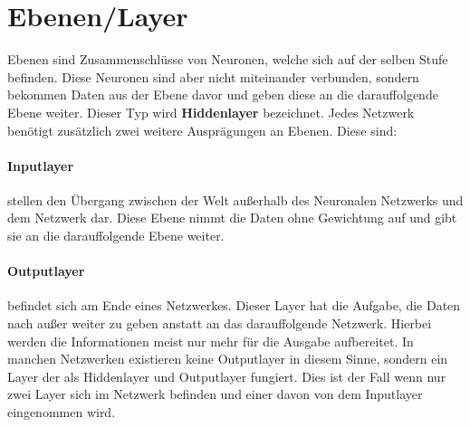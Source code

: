 \section{Ebenen/Layer}
\label{sec:Layer}

Ebenen sind Zusammenschlüsse von Neuronen, welche sich auf der selben Stufe befinden. 
Diese Neuronen sind aber nicht miteinander verbunden, sondern bekommen Daten aus der Ebene davor und geben diese an die darauffolgende Ebene weiter. 
Dieser Typ wird \textbf{Hiddenlayer} bezeichnet. 
Jedes Netzwerk benötigt zusätzlich zwei weitere Ausprägungen an Ebenen. 
Diese sind:

\paragraph{Inputlayer} stellen den Übergang zwischen der Welt außerhalb des Neuronalen Netzwerks und dem Netzwerk dar.
Diese Ebene nimmt die Daten ohne Gewichtung auf und gibt sie an die darauffolgende Ebene weiter. 

\paragraph{Outputlayer} befindet sich am Ende eines Netzwerkes. 
Dieser Layer hat die Aufgabe, die Daten nach außer weiter zu geben anstatt an das darauffolgende Netzwerk. 
Hierbei werden die Informationen meist nur mehr für die Ausgabe aufbereitet. 
In manchen Netzwerken existieren keine Outputlayer in diesem Sinne, sondern ein Layer der als Hiddenlayer und Outputlayer fungiert. 
Dies ist der Fall wenn nur zwei Layer sich im Netzwerk befinden und einer davon von dem Inputlayer eingenommen wird.
\\

